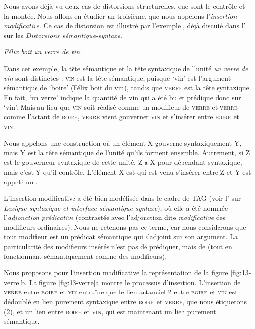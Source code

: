 Nous avons déjà vu deux cas de distorsions structurelles, que sont le contrôle et la montée. Nous allons en étudier un troisième, que nous appelons l’\textit{insertion modificative}. Ce cas de distorsion est illustré par l’exemple , déjà discuté dans l’ sur les \textit{Distorsions sémantique-syntaxe}.

\ea\label{ex:13-verre} \textit{Félix boit un verre de vin.}\z

Dans cet exemple, la tête sémantique et la tête syntaxique de l’unité \textit{un verre de vin} sont distinctes : \textsc{vin} est la tête sémantique, puisque ‘vin’ est l’argument sémantique de ‘boire’ (Félix boit du vin), tandis que \textsc{verre} est la tête syntaxique. En fait, ‘un verre’ indique la quantité de vin qui a été bu et prédique donc sur ‘vin’. Mais au lieu que \textsc{vin} soit réalisé comme un modifieur de \textsc{verre} et \textsc{verre} comme l’actant de \textsc{boire}, \textsc{verre} vient gouverner \textsc{vin} et s’insérer entre \textsc{boire} et \textsc{vin}.

{Nous appelons  une construction où un élément X gouverne syntaxiquement Y, mais Y est la tête sémantique de l’unité qu’ils forment ensemble. Autrement, si Z est le gouverneur syntaxique de cette unité, Z a X pour dépendant syntaxique, mais c’est Y qu’il contrôle. L’élément X est qui est venu s’insérer entre Z et Y est appelé un .}

L’insertion modificative a été bien modélisée dans le cadre de TAG (voir l’ sur \textit{Lexique syntaxique et interface sémantique-syntaxe}), où elle a été nommée l’\textit{adjonction prédicative} (contrastée avec l’adjonction dite \textit{modificative} des modifieurs ordinaires). Nous ne retenons pas ce terme, car nous considérons que tout modifieur est un prédicat sémantique qui s’adjoint sur son argument. La particularité des modifieurs insérés n'est pas de prédiquer, mais de  (tout en fonctionnant sémantiquement comme des modifieurs).

Nous proposons pour l’insertion modificative la représentation de la figure \ref{fig:13-verre}b. La figure \ref{fig:13-verre}a montre le processus d’insertion. L'insertion de \textsc{verre} entre \textsc{boire} et \textsc{vin} entraîne que le lien actanciel 2 entre \textsc{boire} et \textsc{vin} est dédoublé en lien purement syntaxique entre \textsc{boire} et \textsc{verre}, que nous étiquetons (2), et un lien entre \textsc{boire} et \textsc{vin}, qui est maintenant un lien purement sémantique.

